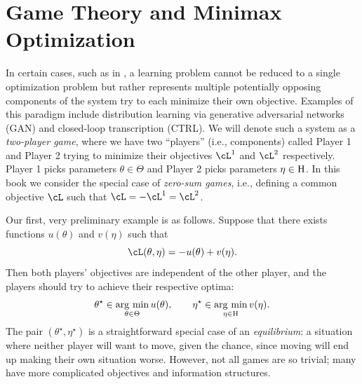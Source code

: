 \documentclass[../../book-main.tex]{subfiles}
\begin{document}
\section{Game Theory and Minimax Optimization} \label{sec:minimax}\label{sec:game_theory}

In certain cases, such as in , a learning problem cannot be reduced to a single optimization problem but rather represents multiple potentially opposing components of the system try to each minimize their own objective. Examples of this paradigm include distribution learning via generative adversarial networks (GAN) and closed-loop transcription (CTRL). We will denote such a system as a \textit{two-player game}, where we have two ``players'' (i.e., components) called Player 1 and Player 2 trying to minimize their objectives \(\cL^{1}\) and \(\cL^{2}\) respectively. Player 1 picks parameters \(\theta \in \Theta\) and Player 2 picks parameters \(\eta \in \mathrm{H}\). In this book we consider the special case of \textit{zero-sum games}, i.e., defining a common objective \(\cL\) such that \(\cL = -\cL^{1} = \cL^{2}\).

Our first, very preliminary example is as follows. Suppose that there exists functions \(u(\theta)\) and \(v(\eta)\) such that 
\begin{equation}
    \cL(\theta, \eta) = -u(\theta) + v(\eta).
\end{equation}
Then both players' objectives are independent of the other player, and the players should try to achieve their respective optima:
\begin{equation}
    \theta^{\star} \in \operatorname*{arg\ min}_{\theta \in \Theta}u(\theta), \qquad \eta^{\star} \in \operatorname*{arg\ min}_{\eta \in \mathrm{H}}v(\eta).
\end{equation}
The pair \((\theta^{\star}, \eta^{\star})\) is a straightforward special case of an \textit{equilibrium}: a situation where neither player will want to move, given the chance, since moving will end up making their own situation worse. However, not all games are so trivial; many have more complicated objectives and information structures.
\end{document}
